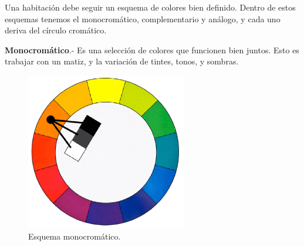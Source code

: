 Una habitación debe seguir un esquema de colores bien definido. Dentro de estos esquemas tenemos el monocromático, complementario y análogo, y cada uno deriva del círculo cromático.\par

\textbf{Monocromático}.- Es una selección de colores que funcionen bien juntos. Esto es trabajar con un matiz, y la variación de tintes, tonos, y sombras.
\begin{figure}[h!]
	\centering
	\includegraphics[width=7cm]{imagenes/marcoteorico/disenointeriores/monocromatico.png}
	\caption{Esquema monocromático.\cite{B13}}
	\label{fig:monocromatico}
\end{figure}

